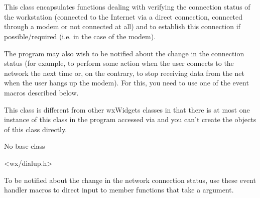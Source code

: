 
\section{}\label{wxdialupmanager}

This class encapsulates functions dealing with verifying the connection status
of the workstation (connected to the Internet via a direct connection,
connected through a modem or not connected at all) and to establish this
connection if possible/required (i.e. in the case of the modem).

The program may also wish to be notified about the change in the connection
status (for example, to perform some action when the user connects to the
network the next time or, on the contrary, to stop receiving data from the net
when the user hangs up the modem). For this, you need to use one of the event
macros described below.

This class is different from other wxWidgets classes in that there is at most
one instance of this class in the program accessed via 
 and you can't
create the objects of this class directly.


No base class


<wx/dialup.h>


To be notified about the change in the network connection status, use these
event handler macros to direct input to member functions that take a 
 argument.

\twocolwidtha{7cm}
\begin{twocollist}\itemsep=0pt
\end{twocollist}%

